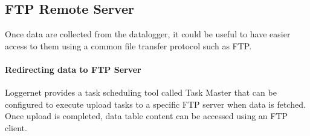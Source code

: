 \subsection{FTP Remote Server}
Once data are collected from the datalogger, it could be useful to have easier access to them using a common file transfer protocol such as FTP.
\paragraph{Redirecting data to FTP Server}
Loggernet provides a task scheduling tool called Task Master that can be configured to execute upload tasks to a specific FTP server when data is fetched. Once upload is completed, data table content can be accessed using an FTP client.